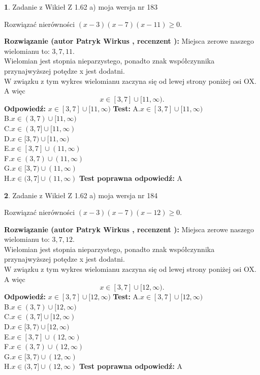 \documentclass[12pt, a4paper]{article}
\theoremstyle{definition} %
\newtheorem{zad}{}
\newcommand{\zadStart}[1]{\begin{zad}#1\newline}
\newcommand{\zadStop}{\end{zad}}
\newcommand{\rozwStart}[2]{\noindent \textbf{Rozwiązanie (autor #1 , recenzent #2): }\newline}
\newcommand{\rozwStop}{\newline}
\newcommand{\odpStart}{\noindent \textbf{Odpowiedź:}\newline}
\newcommand{\odpStop}{\newline}
\newcommand{\testStart}{\noindent \textbf{Test:}\newline}
\newcommand{\testStop}{\newline}
\newcommand{\kluczStart}{\noindent \textbf{Test poprawna odpowiedź:}\newline}
\newcommand{\kluczStop}{\newline}
\begin{document}
\zadStart{Zadanie z Wikieł Z 1.62 a) moja wersja nr 183}

Rozwiązać nierówności $(x-3)(x-7)(x-11)\ge0$.
\zadStop
\rozwStart{Patryk Wirkus}{}
Miejsca zerowe naszego wielomianu to: $3, 7, 11$.\\
Wielomian jest stopnia nieparzystego, ponadto znak współczynnika przy\linebreak najwyższej potędze x jest dodatni.\\ W związku z tym wykres wielomianu zaczyna się od lewej strony poniżej osi OX. A więc $$x \in [3,7] \cup [11,\infty).$$
\rozwStop
\odpStart
$x \in [3,7] \cup [11,\infty)$
\odpStop
\testStart
A.$x \in [3,7] \cup [11,\infty)$\\
B.$x \in (3,7) \cup [11,\infty)$\\
C.$x \in (3,7] \cup [11,\infty)$\\
D.$x \in [3,7) \cup [11,\infty)$\\
E.$x \in [3,7] \cup (11,\infty)$\\
F.$x \in (3,7) \cup (11,\infty)$\\
G.$x \in [3,7) \cup (11,\infty)$\\
H.$x \in (3,7] \cup (11,\infty)$
\testStop
\kluczStart
A
\kluczStop



\zadStart{Zadanie z Wikieł Z 1.62 a) moja wersja nr 184}

Rozwiązać nierówności $(x-3)(x-7)(x-12)\ge0$.
\zadStop
\rozwStart{Patryk Wirkus}{}
Miejsca zerowe naszego wielomianu to: $3, 7, 12$.\\
Wielomian jest stopnia nieparzystego, ponadto znak współczynnika przy\linebreak najwyższej potędze x jest dodatni.\\ W związku z tym wykres wielomianu zaczyna się od lewej strony poniżej osi OX. A więc $$x \in [3,7] \cup [12,\infty).$$
\rozwStop
\odpStart
$x \in [3,7] \cup [12,\infty)$
\odpStop
\testStart
A.$x \in [3,7] \cup [12,\infty)$\\
B.$x \in (3,7) \cup [12,\infty)$\\
C.$x \in (3,7] \cup [12,\infty)$\\
D.$x \in [3,7) \cup [12,\infty)$\\
E.$x \in [3,7] \cup (12,\infty)$\\
F.$x \in (3,7) \cup (12,\infty)$\\
G.$x \in [3,7) \cup (12,\infty)$\\
H.$x \in (3,7] \cup (12,\infty)$
\testStop
\kluczStart
A
\kluczStop
\end{document}
